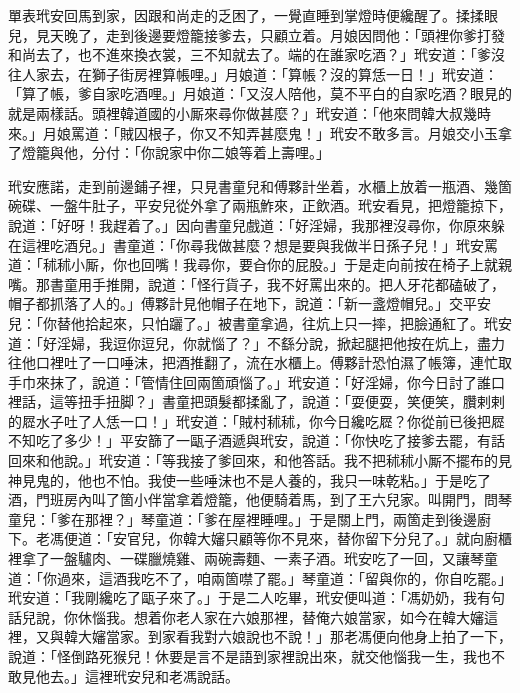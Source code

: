 單表玳安回馬到家，因跟和尚走的乏困了，一覺直睡到掌燈時便纔醒了。揉揉眼兒，見天晚了，走到後邊要燈籠接爹去，只顧立着。月娘因問他：「頭裡你爹打發和尚去了，也不進來換衣裳，三不知就去了。端的在誰家吃酒？」玳安道：「爹沒往人家去，在獅子街房裡算帳哩。」月娘道：「算帳？沒的算恁一日！」玳安道：「算了帳，爹自家吃酒哩。」月娘道：「又沒人陪他，莫不平白的自家吃酒？眼見的就是兩樣話。頭裡韓道國的小厮來尋你做甚麼？」玳安道：「他來問韓大叔幾時來。」月娘罵道：「賊囚根子，你又不知弄甚麼鬼！」玳安不敢多言。月娘交小玉拿了燈籠與他，分付：「你說家中你二娘等着上壽哩。」

玳安應諾，走到前邊鋪子裡，只見書童兒和傅夥計坐着，水櫃上放着一瓶酒、幾箇碗碟、一盤牛肚子，平安兒從外拿了兩瓶鮓來，正飲酒。玳安看見，把燈籠掠下，說道：「好呀！我趕着了。」因向書童兒戲道：「好淫婦，我那裡沒尋你，你原來躲在這裡吃酒兒。」書童道：「你尋我做甚麼？想是要與我做半日孫子兒！」玳安罵道：「秫秫小厮，你也回嘴！我尋你，要㒲你的屁股。」于是走向前按在椅子上就親嘴。那書童用手推開，說道：「怪行貨子，我不好罵出來的。把人牙花都磕破了，帽子都抓落了人的。」傅夥計見他帽子在地下，說道：「新一盞燈帽兒。」交平安兒：「你替他拾起來，只怕躧了。」被書童拿過，往炕上只一摔，把臉通紅了。玳安道：「好淫婦，我逗你逗兒，你就惱了？」不繇分說，掀起腿把他按在炕上，盡力往他口裡吐了一口唾沫，把酒推翻了，流在水櫃上。傅夥計恐怕濕了帳簿，連忙取手巾來抹了，說道：「管情住回兩箇頑惱了。」玳安道：「好淫婦，你今日討了誰口裡話，這等扭手扭脚？」書童把頭髮都揉亂了，說道：「耍便耍，笑便笑，臢剌剌的㞞水子吐了人恁一口！」玳安道：「賊村秫秫，你今日纔吃㞞？你從前已後把㞞不知吃了多少！」平安篩了一甌子酒遞與玳安，說道：「你快吃了接爹去罷，有話回來和他說。」玳安道：「等我接了爹回來，和他答話。我不把秫秫小厮不擺布的見神見鬼的，他也不怕。我使一些唾沫也不是人養的，我只一味乾粘。」于是吃了酒，門班房內叫了箇小伴當拿着燈籠，他便騎着馬，到了王六兒家。叫開門，問琴童兒：「爹在那裡？」琴童道：「爹在屋裡睡哩。」于是關上門，兩箇走到後邊廚下。老馮便道：「安官兒，你韓大嬸只顧等你不見來，替你留下分兒了。」就向廚櫃裡拿了一盤驢肉、一碟臘燒雞、兩碗壽麵、一素子酒。玳安吃了一回，又讓琴童道：「你過來，這酒我吃不了，咱兩箇噤了罷。」琴童道：「留與你的，你自吃罷。」玳安道：「我剛纔吃了甌子來了。」于是二人吃畢，玳安便叫道：「馮奶奶，我有句話兒說，你休惱我。想着你老人家在六娘那裡，替俺六娘當家，如今在韓大嬸這裡，又與韓大嬸當家。{}到家看我對六娘說也不說！」那老馮便向他身上拍了一下，說道：「怪倒路死猴兒！休要是言不是語到家裡說出來，就交他惱我一生，我也不敢見他去。」這裡玳安兒和老馮說話。

